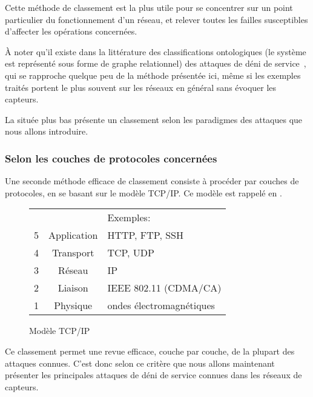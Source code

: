 Cette méthode de classement est la plus utile pour se concentrer sur un point particulier du fonctionnement d'un réseau, et relever toutes les failles susceptibles d'affecter les opérations concernées.

À noter qu'il existe dans la littérature des classifications ontologiques (le système est représenté sous forme de graphe relationnel) des attaques de déni de service~\cite{VS10}, qui se rapproche quelque peu de la méthode présentée ici, même si les exemples traités portent le plus souvent sur les réseaux en général sans évoquer les capteurs.

La  située plus bas présente un classement selon les paradigmes des attaques que nous allons introduire.

    \subsubsection{Selon les couches de protocoles concernées}
Une seconde méthode efficace de classement consiste à procéder par couches de protocoles, en se basant sur le modèle TCP/IP.
Ce modèle est rappelé en .
\begin{figure}[!ht]
    \centering
    \begin{tabular}{c |c| l}
        \multicolumn{2}{c}{} & Exemples:\\
        \cline{2-2}
        5 & Application & HTTP, FTP, SSH\\
        \cline{2-2}
        4 & Transport & TCP, UDP\\
        \cline{2-2}
        3 & Réseau & IP\\
        \cline{2-2}
        2 & Liaison & IEEE 802.11 (CDMA/CA)\\
        \cline{2-2}
        1 & Physique & ondes électromagnétiques\\
        \cline{2-2}
     \end{tabular}
    \medskip
    \caption{Modèle TCP/IP}\label{ea:fig:tcpip}
\end{figure}

Ce classement permet une revue efficace, couche par couche, de la plupart des attaques connues.
C'est donc selon ce critère que nous allons maintenant présenter les principales attaques de déni de service connues dans les réseaux de capteurs.
